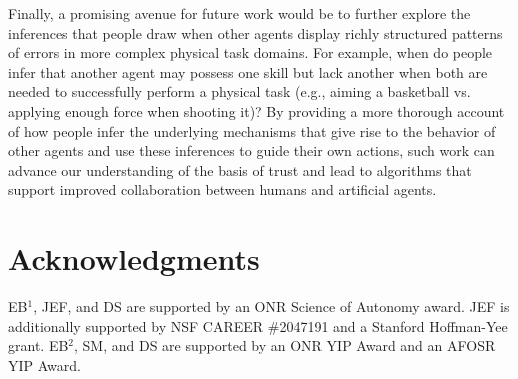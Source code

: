 \documentclass[10pt,letterpaper]{article}
\begin{document}
Finally, a promising avenue for future work would be to further explore the inferences that people draw when other agents display richly structured patterns of errors in more complex physical task domains.
For example, when do people infer that another agent may possess one skill but lack another when both are needed to successfully perform a physical task (e.g., aiming a basketball vs. applying enough force when shooting it)? By providing a more thorough account of how people infer the underlying mechanisms that give rise to the behavior of other agents and use these inferences to guide their own actions, such work can advance our understanding of the basis of trust and lead to algorithms that support improved collaboration between humans and artificial agents.


\newpage

\section{Acknowledgments}
EB$^{1}$, JEF, and DS are supported by an ONR Science of Autonomy award. 
JEF is additionally supported by NSF CAREER \#2047191 and a Stanford Hoffman-Yee grant. 
EB$^{2}$, SM, and DS are supported by an ONR YIP Award and an AFOSR YIP Award.









\setlength{\bibleftmargin}{.125in}
\setlength{\bibindent}{-\bibleftmargin}
\typeout{} %

\end{document}
